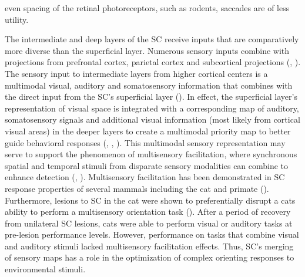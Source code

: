 \documentclass{ar-1col}
\begin{document}
even spacing of the retinal photoreceptors, such as rodents, saccades are of less utility. 

The intermediate and deep layers of the SC receive inputs that are comparatively more diverse than the superficial layer. Numerous sensory inputs combine with projections from prefrontal cortex, parietal cortex and subcortical projections (\cite{schneider2014brain}, \cite{white2011superior}). The sensory input to intermediate layers from higher cortical centers is a multimodal visual, auditory and somatosensory information that combines with the direct input from the SC’s superficial layer (\cite{meredith1986visual}). In effect, the superficial layer’s representation of visual space is integrated with a corresponding map of auditory, somatosensory signals and additional visual information (most likely from cortical visual areas) in the deeper layers to create a multimodal priority map to better guide behavioral responses (\cite{drager1975responses}, \cite{meredith1986visual}, \cite{king2004superior}). This multimodal sensory representation may serve to support the phenomenon of multisensory facilitation, where synchronous spatial and temporal stimuli from disparate sensory modalities can combine to enhance detection (\cite{welch1986contributions}, \cite{stein1993merging}). Multisensory facilitation has been demonstrated in SC response properties of several mammals including the cat and primate (\cite{wallace1996representation}). Furthermore, lesions to SC in the cat were shown to preferentially disrupt a cats ability to perform a multisensory orientation task (\cite{burnett2004superior}). After a period of recovery from unilateral SC lesions, cats were able to perform visual or auditory tasks at pre-lesion performance levels. However, performance on tasks that combine visual and auditory stimuli lacked multisensory facilitation effects. Thus, SC’s merging of sensory maps has a role in the optimization of complex orienting responses to environmental stimuli. 
\end{document}
